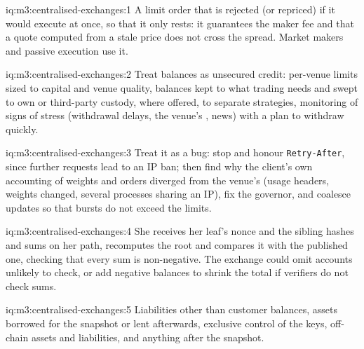 \begin{solution}{iq:m3:centralised-exchanges:1}
A limit order that is rejected (or repriced) if it would execute at once, so that it only rests: it
guarantees the maker fee and that a quote computed from a stale price does not cross the spread. Market
makers and passive execution use it.
\end{solution}

\begin{solution}{iq:m3:centralised-exchanges:2}
Treat balances as unsecured credit: per-venue limits sized to capital and venue quality, balances kept to
what trading needs and swept to own or third-party custody,  where offered, 
to separate strategies, monitoring of signs of stress (withdrawal delays, the venue's , news) with a plan
to withdraw quickly.
\end{solution}

\begin{solution}{iq:m3:centralised-exchanges:3}
Treat it as a bug: stop and honour \texttt{Retry-After}, since further requests lead to an IP ban; then find
why the client's own accounting of weights and orders diverged from the venue's (usage headers, weights
changed, several processes sharing an IP), fix the governor, and coalesce updates so that bursts do not
exceed the limits.
\end{solution}

\begin{solution}{iq:m3:centralised-exchanges:4}
She receives her leaf's nonce and the sibling hashes and sums on her path, recomputes the root and compares it
with the published one, checking that every sum is non-negative. The exchange could omit accounts unlikely to
check, or add negative balances to shrink the total if verifiers do not check sums.
\end{solution}

\begin{solution}{iq:m3:centralised-exchanges:5}
Liabilities other than customer balances, assets borrowed for the snapshot or lent afterwards, exclusive
control of the keys, off-chain assets and liabilities, and anything after the snapshot.
\end{solution}


